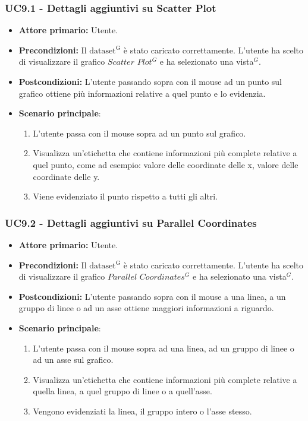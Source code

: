 \subsubsection{UC9.1 - Dettagli aggiuntivi su Scatter Plot}
\label{sec:UC9.1}
\begin{itemize}
    \item \textbf{Attore primario:} Utente.
    \item \textbf{Precondizioni:} Il ${\mathrm{dataset^{G}}}$ è stato caricato correttamente. L'utente ha scelto di visualizzare il grafico $Scatter$ $Plot^{G}$ e ha selezionato una vista$^{G}$.
    \item \textbf{Postcondizioni:} L'utente passando sopra con il mouse ad un punto sul grafico ottiene più informazioni relative a quel punto e lo evidenzia.
    \item \textbf{Scenario principale}: 
    \begin{enumerate}
		\item L'utente passa con il mouse sopra ad un punto sul grafico.
		\item Visualizza un'etichetta che contiene informazioni più complete relative a quel punto, come ad esempio: valore delle coordinate delle x, valore delle coordinate delle y. 
		\item Viene evidenziato il punto rispetto a tutti gli altri.
	\end{enumerate}
\end{itemize}

\subsubsection{UC9.2 - Dettagli aggiuntivi su Parallel Coordinates}
\label{sec:UC9.2}
\begin{itemize}
    \item \textbf{Attore primario:} Utente.
    \item \textbf{Precondizioni:} Il ${\mathrm{dataset^{G}}}$ è stato caricato correttamente. L'utente ha scelto di visualizzare il grafico $Parallel$ $Coordinates^{G}$ e ha selezionato una vista$^{G}$.
    \item \textbf{Postcondizioni:} L'utente passando sopra con il mouse a una linea, a un gruppo di linee o ad un asse ottiene maggiori informazioni a riguardo.
    \item \textbf{Scenario principale}:
    \begin{enumerate}
		\item L'utente passa con il mouse sopra ad una linea, ad un gruppo di linee o ad un asse sul grafico.
		\item Visualizza un'etichetta che contiene informazioni più complete relative a quella linea, a quel gruppo di linee o a quell'asse.
		\item Vengono evidenziati la linea, il gruppo intero o l'asse stesso.
	\end{enumerate}
\end{itemize}

